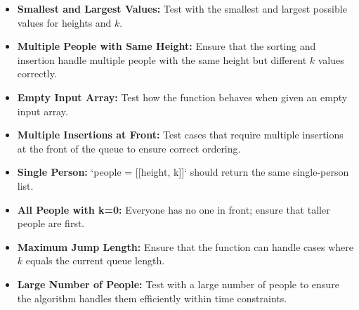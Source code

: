 \begin{itemize}
    \item \textbf{Smallest and Largest Values:} Test with the smallest and largest possible values for heights and \( k \).
    
    \item \textbf{Multiple People with Same Height:} Ensure that the sorting and insertion handle multiple people with the same height but different \( k \) values correctly.
    
    \item \textbf{Empty Input Array:} Test how the function behaves when given an empty input array.
    
    \item \textbf{Multiple Insertions at Front:} Test cases that require multiple insertions at the front of the queue to ensure correct ordering.
    
    \item \textbf{Single Person:} `people = [[height, k]]` should return the same single-person list.
    
    \item \textbf{All People with k=0:} Everyone has no one in front; ensure that taller people are first.
    
    \item \textbf{Maximum Jump Length:} Ensure that the function can handle cases where \( k \) equals the current queue length.
    
    \item \textbf{Large Number of People:} Test with a large number of people to ensure the algorithm handles them efficiently within time constraints.
\end{itemize}

\printindex